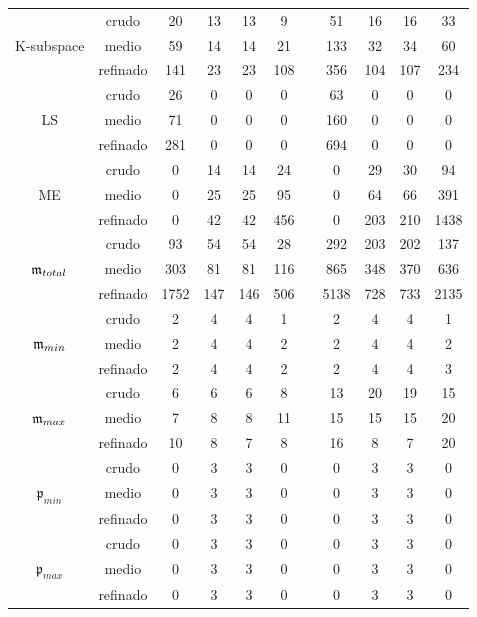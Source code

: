 \begin{table}
\begin{adjustbox}{width=0.95\columnwidth,center}
\begin{tabular}{ccccccccccc}
			& crudo & 20 & 13 & 13 & 9 &  & 51 & 16 & 16 & 33 \\
			K-subspace & medio & 59 & 14 & 14 & 21 &  & 133 & 32 & 34 & 60 \\
			& refinado & 141 & 23 & 23 & 108 &  & 356 & 104 & 107 & 234 \\
			\hline
			& crudo & 26 & 0 & 0 & 0 &  & 63 & 0 & 0 & 0 \\
			LS & medio & 71 & 0 & 0 & 0 &  & 160 & 0 & 0 & 0 \\
			& refinado & 281 & 0 & 0 & 0 &  & 694 & 0 & 0 & 0 \\
			\hline
			& crudo & 0 & 14 & 14 & 24 &  & 0 & 29 & 30 & 94 \\
			ME & medio & 0 & 25 & 25 & 95 &  & 0 & 64 & 66 & 391 \\
			& refinado & 0 & 42 & 42 & 456 &  & 0 & 203 & 210 & 1438 \\
			\hline
			& crudo & 93 & 54 & 54 & 28 &  & 292 & 203 & 202 & 137 \\
			$\mathfrak{m}_{total}$ & medio & 303 & 81 & 81 & 116 &  & 865 & 348 & 370 & 636 \\
			& refinado & 1752 & 147 & 146 & 506 &  & 5138 & 728 & 733 & 2135 \\
			\hline
			& crudo & 2 & 4 & 4 & 1 &  & 2 & 4 & 4 & 1 \\
			$\mathfrak{m}_{min}$ & medio & 2 & 4 & 4 & 2 &  & 2 & 4 & 4 & 2 \\
			& refinado & 2 & 4 & 4 & 2 &  & 2 & 4 & 4 & 3 \\
			\hline
			& crudo & 6 & 6 & 6 & 8 &  & 13 & 20 & 19 & 15 \\
			$\mathfrak{m}_{max}$ & medio & 7 & 8 & 8 & 11 &  & 15 & 15 & 15 & 20 \\
			& refinado & 10 & 8 & 7 & 8 &  & 16 & 8 & 7 & 20 \\
			\hline
			& crudo & 0 & 3 & 3 & 0 &  & 0 & 3 & 3 & 0 \\
			$\mathfrak{p}_{min}$ & medio & 0 & 3 & 3 & 0 &  & 0 & 3 & 3 & 0 \\
			& refinado & 0 & 3 & 3 & 0 &  & 0 & 3 & 3 & 0 \\
			\hline
			& crudo & 0 & 3 & 3 & 0 &  & 0 & 3 & 3 & 0 \\
			$\mathfrak{p}_{max}$ & medio & 0 & 3 & 3 & 0 &  & 0 & 3 & 3 & 0 \\
			& refinado & 0 & 3 & 3 & 0 &  & 0 & 3 & 3 & 0 \\
			\hline
		\end{tabular}
	\end{adjustbox}
\end{table}

